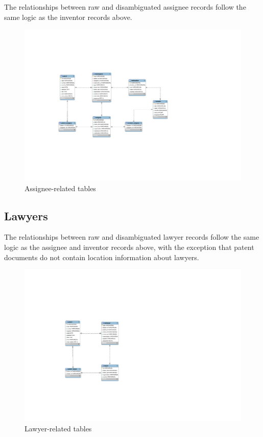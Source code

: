 The relationships between raw and disambiguated assignee records follow the same logic as the inventor records above.

\begin{figure}[!htbp]
\includegraphics[width=\linewidth]{figs/Assignee}
\caption{Assignee-related tables}
\end{figure}

\subsection*{Lawyers}

The relationships between raw and disambiguated lawyer records follow the same logic as the assignee and inventor records above, with the exception
that patent documents do not contain location information about lawyers.

\begin{figure}[!htbp]
\includegraphics[width=.3\linewidth]{figs/Lawyer}
\caption{Lawyer-related tables}
\end{figure}